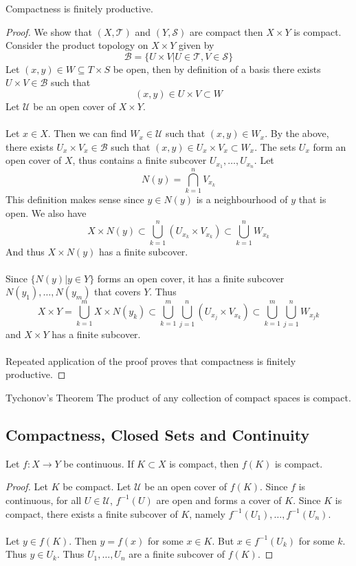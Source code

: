 \documentclass[a4paper]{article}
\begin{document}
\begin{prp}{}{} Compactness is finitely productive. \tcbline
\begin{proof}
We show that $(X,\mathcal{T})$ and $(Y,\mathcal{S})$ are compact then $X\times Y$ is compact. Consider the product topology on $X\times Y$ given by $$\mathcal{B}=\{U\times V|U\in\mathcal{T},V\in\mathcal{S}\}$$ Let $(x,y)\in W\subseteq T\times S$ be open, then by definition of a basis there exists $U\times V\in\mathcal{B}$ such that $$(x,y)\in U\times V\subset W$$ Let $\mathcal{U}$ be an open cover of $X\times Y$. \\~\\
Let $x\in X$. Then we can find $W_x\in\mathcal{U}$ such that $(x,y)\in W_x$. By the above, there exists $U_x\times V_x\in\mathcal{B}$ such that $(x,y)\in U_x\times V_x\subset W_x$. The sets $U_x$ form an open cover of $X$, thus contains a finite subcover $U_{x_1},\dots,U_{x_n}$. Let $$N(y)=\bigcap_{k=1}^nV_{x_k}$$ This definition makes sense since $y\in N(y)$ is a neighbourhood of $y$ that is open. We also have $$X\times N(y)\subset\bigcup_{k=1}^n(U_{x_k}\times V_{x_k})\subset\bigcup_{k=1}^nW_{x_k}$$ And thus $X\times N(y)$ has a finite subcover. \\~\\
Since $\{N(y)|y\in Y\}$ forms an open cover, it has a finite subcover $N(y_1),\dots,N(y_m)$ that covers $Y$. Thus $$X\times Y=\bigcup_{k=1}^mX\times N(y_k)\subset\bigcup_{k=1}^m\bigcup_{j=1}^n(U_{x_j}\times V_{x_k})\subset\bigcup_{k=1}^m\bigcup_{j=1}^nW_{x_jk}$$ and $X\times Y$ has a finite subcover. \\~\\
Repeated application of the proof proves that compactness is finitely productive. 
\end{proof}
\end{prp}

\begin{thm}{Tychonov's Theorem}{} The product of any collection of compact spaces is compact. 
\end{thm}

\subsection{Compactness, Closed Sets and Continuity}
\begin{prp}{}{} Let $f:X\to Y$ be continuous. If $K\subset X$ is compact, then $f(K)$ is compact.  \tcbline
\begin{proof}
Let $K$ be compact. Let $\mathcal{U}$ be an open cover of $f(K)$. Since $f$ is continuous, for all $U\in\mathcal{U}$, $f^{-1}(U)$ are open and forms a cover of $K$. Since $K$ is compact, there exists a finite subcover of $K$, namely $f^{-1}(U_1),\dots,f^{-1}(U_n)$. \\~\\
Let $y\in f(K)$. Then $y=f(x)$ for some $x\in K$. But $x\in f^{-1}(U_k)$ for some $k$. Thus $y\in U_k$. Thus $U_1,\dots,U_n$ are a finite subcover of $f(K)$. 
\end{proof}
\end{prp}
\end{document}
